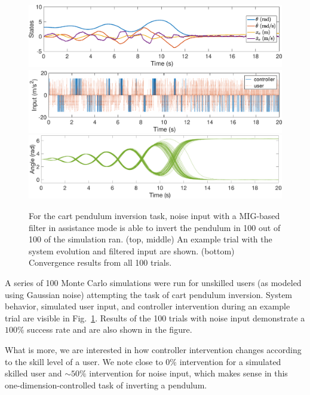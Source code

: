 \begin{figure}[!t]
\begin{center}
    \includegraphics[width=1\columnwidth, keepaspectratio]{MC_states_1.eps}
    \includegraphics[width=1\columnwidth, keepaspectratio]{MC_control_1.eps}
    \includegraphics[width=1\columnwidth, keepaspectratio]{MC_angle_100.eps}
\end{center}
\caption{For the cart pendulum inversion task, noise input with a MIG-based filter in assistance mode is able to invert the pendulum in 100 out of 100 of the simulation ran. (top, middle) An example trial with the system evolution and filtered input are shown. (bottom) Convergence results from all 100 trials.}
\label{fig: MC_cp}
\end{figure}

A series of 100 Monte Carlo simulations were run for unskilled users (as modeled using Gaussian noise) attempting the task of cart pendulum inversion. System behavior, simulated user input, and controller intervention during an example trial are visible in Fig.~\ref{fig: MC_cp}. Results of the 100 trials with noise input demonstrate a $100\%$ success rate and are also shown in the figure.

What is more, we are interested in how controller intervention changes according to the skill level of a user. We note close to $0\%$ intervention for a simulated skilled user and $\sim50\%$ intervention for noise input, which makes sense in this one-dimension-controlled task of inverting a pendulum. 

